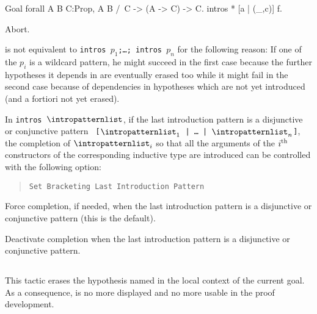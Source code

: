 \begin{coq_example}
Goal forall A B C:Prop, A \/ B /\ C -> (A -> C) -> C.
intros * [a | (_,c)] f.
\end{coq_example}
\begin{coq_eval}
Abort.
\end{coq_eval}

 is not equivalent to \texttt{intros
  $p_1$;\ldots; intros $p_n$} for the following reason: If one of the
$p_i$ is a wildcard pattern, he might succeed in the first case
because the further hypotheses it depends in are eventually erased too
while it might fail in the second case because of dependencies in
hypotheses which are not yet introduced (and a fortiori not yet
erased).

\Rem In {\tt intros $\intropatternlist$}, if the last introduction
pattern is a disjunctive or conjunctive pattern {\tt
  [$\intropatternlist_1$ | \dots\ | $\intropatternlist_n$]}, the
completion of $\intropatternlist_i$ so that all the arguments of the
$i^{\mbox{\scriptsize th}}$ constructors of the corresponding
inductive type are introduced can be controlled with the
following option:

\begin{quote}
{\tt Set Bracketing Last Introduction Pattern}
\end{quote}

Force completion, if needed, when the last introduction pattern is a
disjunctive or conjunctive pattern (this is the default).

\begin{quote}
{}
\end{quote}

Deactivate completion when the last introduction pattern is a disjunctive
or conjunctive pattern.

\subsection{}
\label{clear}

This tactic erases the hypothesis named {\ident} in the local context
of the current goal. As a consequence, {\ident} is no more displayed and no more
usable in the proof development.

\begin{ErrMsgs}
\item {}
\item {}
\item {}
\end{ErrMsgs}

